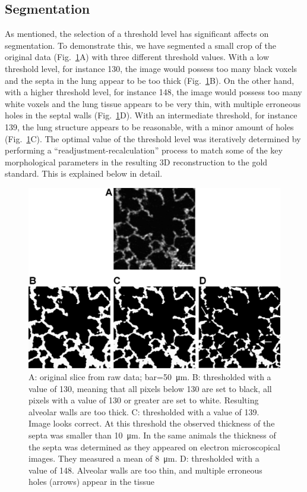 \subsection{Segmentation}
As mentioned, the selection of a threshold level has significant affects on segmentation. To demonstrate this, we have segmented a small crop of the original data (Fig.~\ref{fig:segmentation}A) with three different threshold values. With a low threshold level, for instance 130, the image would possess too many black voxels and the septa in the lung appear to be too thick (Fig.~\ref{fig:segmentation}B). On the other hand, with a higher threshold level, for instance 148, the image would possess too many white voxels and the lung tissue appears to be very thin, with multiple erroneous holes in the septal walls (Fig.~\ref{fig:segmentation}D). With an intermediate threshold, for instance 139, the lung structure appears to be reasonable, with a minor amount of holes (Fig.~\ref{fig:segmentation}C). The optimal value of the threshold level was iteratively determined by performing a ``readjustment-recalculation'' process to match some of the key morphological parameters in the resulting 3D reconstruction to the gold standard. This is explained below in detail.

\begin{figure}[htb]
	\centering
	\includegraphics[width=\imsize]{img/Tsuda2008/Tsuda-06}
	\caption{A: original slice from raw data; bar=\SI{50}{\micro\meter}. B: thresholded with a value of 130, meaning that all pixels below 130 are set to black, all pixels with a value of 130 or greater are set to white. Resulting alveolar walls are too thick. C: thresholded with a value of 139. Image looks correct. At this
threshold the observed thickness of the septa was smaller than \SI{10}{\micro\meter}. In the same animals \cite{Roth2005} the thickness of the septa was determined as they appeared on electron microscopical images. They measured a mean of \SI{8}{\micro\meter}. D: thresholded with a value of 148. Alveolar walls are too thin, and multiple erroneous holes (arrows) appear in the tissue}
	\label{fig:segmentation}
\end{figure}

